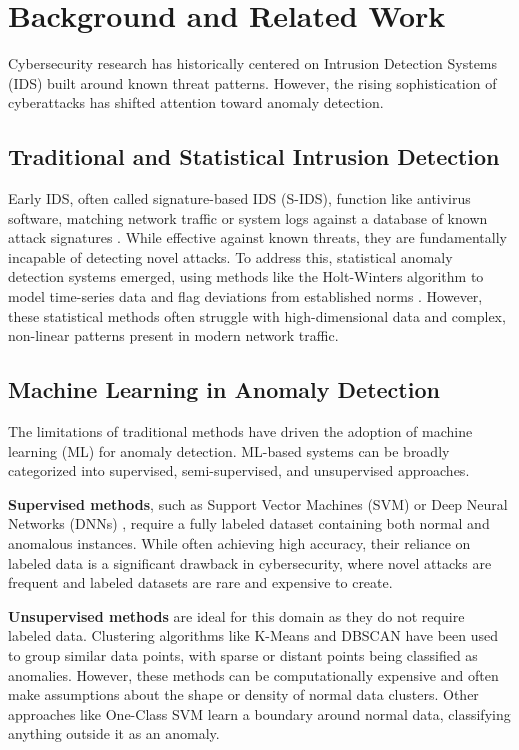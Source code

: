 \documentclass[conference]{IEEEtran}
\begin{document}
\section{Background and Related Work}
Cybersecurity research has historically centered on Intrusion Detection Systems (IDS) built around known threat patterns. However, the rising sophistication of cyberattacks has shifted attention toward anomaly detection.

\subsection{Traditional and Statistical Intrusion Detection}
Early IDS, often called signature-based IDS (S-IDS), function like antivirus software, matching network traffic or system logs against a database of known attack signatures \cite{sommer2010outside}. While effective against known threats, they are fundamentally incapable of detecting novel attacks. To address this, statistical anomaly detection systems emerged, using methods like the Holt-Winters algorithm to model time-series data and flag deviations from established norms \cite{chandola2009anomaly}. However, these statistical methods often struggle with high-dimensional data and complex, non-linear patterns present in modern network traffic.

\subsection{Machine Learning in Anomaly Detection}
The limitations of traditional methods have driven the adoption of machine learning (ML) for anomaly detection. ML-based systems can be broadly categorized into supervised, semi-supervised, and unsupervised approaches.

\textbf{Supervised methods}, such as Support Vector Machines (SVM) or Deep Neural Networks (DNNs) \cite{shone2018deep}, require a fully labeled dataset containing both normal and anomalous instances. While often achieving high accuracy, their reliance on labeled data is a significant drawback in cybersecurity, where novel attacks are frequent and labeled datasets are rare and expensive to create.

\textbf{Unsupervised methods} are ideal for this domain as they do not require labeled data. Clustering algorithms like K-Means and DBSCAN \cite{ester1996dbscan} have been used to group similar data points, with sparse or distant points being classified as anomalies. However, these methods can be computationally expensive and often make assumptions about the shape or density of normal data clusters. Other approaches like One-Class SVM \cite{scholkopf2001estimating} learn a boundary around normal data, classifying anything outside it as an anomaly.
\end{document}
